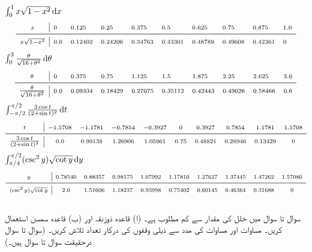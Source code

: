 $\int_0^1 x\sqrt{1-x^2}\dif x$
\begin{align*}
\begin{array}{>{\scriptstyle}c|*9{>{\scriptstyle}l}}
x&0&0.125&0.25&0.375&0.5&0.625&0.75&0.875&1.0\\
\midrule
x\sqrt{1-x^2}&0.0&0.12402&0.24206&0.34763&0.43301&0.48789&0.49608&0.42361&0
\end{array}
\end{align*}
$\int_0^3 \tfrac{\theta}{\sqrt{16+\theta^2}}\dif \theta$
\begin{align*}
\begin{array}{>{\scriptstyle}c|*9{>{\scriptstyle}l}}
\theta&0&0.375&0.75&1.125&1.5&1.875&2.25&2.625&3.0\\
\midrule
\tfrac{\theta}{\sqrt{16+\theta^2}}&0.0&0.09334&0.18429&0.27075&0.35112&0.42443&0.49026&0.58466&0.6
\end{array}
\end{align*}
$\int_{-\pi/2}^{\pi/2} \tfrac{3\cos t}{(2+\sin t)^2}\dif t$
\begin{align*}
\begin{array}{>{\scriptstyle}c|*9{>{\scriptstyle}c}}
t&-1.5708&-1.1781&-0.7854&-0.3927&0&0.3927&0.7854&1.1781&1.5708\\
\midrule
\tfrac{3\cos t}{(2+\sin t)^2}&0.0&0.99138&1.26906&1.05961&0.75&0.48821&0.28946&0.13429&0
\end{array}
\end{align*}
$\int_{\pi/4}^{\pi/2} (\csc^2y)\sqrt{\cot y}\dif y$
\begin{align*}
\begin{array}{>{\scriptstyle}c|*9{>{\scriptstyle}c}}
y&0.78540&0.88357&0.98175&1.07992&1.17810&1.27627&1.37445&1.47262&1.57080\\
\midrule
(\csc^2y)\sqrt{\cot y}&2.0&1.51606&1.18237&0.93998&0.75402&0.60145&0.46364&0.31688&0
\end{array}
\end{align*}
\\
سوال  تا سوال  میں خلل کی مقدار  سے کم مطلوب ہے۔ (ا) قاعدہ ذوزنقہ اور (ب) قاعدہ سمسن استعمال کریں۔  مساوات  اور مساوات  کی مدد سے ذیلی وقفوں کی درکار تعداد تلاش کریں۔ (سوال  تا سوال  درحقیقت سوال  تا سوال  ہیں۔) 

